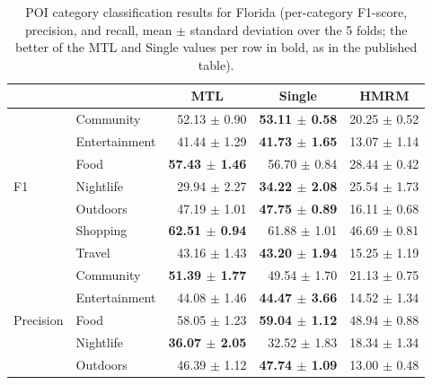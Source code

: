 \begin{table}[htbp]
\caption{POI category classification results for Florida (per-category F1-score, precision, and recall, mean $\pm$ standard deviation over the 5 folds; the better of the MTL and Single values per row in bold, as in the published table).}
\label{tab:cbic:category}
\centering
\begin{tabular}{llrrr}
\toprule
 & & \multicolumn{1}{c}{\textbf{MTL}} & \multicolumn{1}{c}{\textbf{Single}} & \multicolumn{1}{c}{\textbf{HMRM}} \\
\midrule
\multirow{7}{*}{F1}        & Community     & 52.13 $\pm$ 0.90          & \textbf{53.11 $\pm$ 0.58} & 20.25 $\pm$ 0.52 \\
                           & Entertainment & 41.44 $\pm$ 1.29          & \textbf{41.73 $\pm$ 1.65} & 13.07 $\pm$ 1.14 \\
                           & Food          & \textbf{57.43 $\pm$ 1.46} & 56.70 $\pm$ 0.84          & 28.44 $\pm$ 0.42 \\
                           & Nightlife     & 29.94 $\pm$ 2.27          & \textbf{34.22 $\pm$ 2.08} & 25.54 $\pm$ 1.73 \\
                           & Outdoors      & 47.19 $\pm$ 1.01          & \textbf{47.75 $\pm$ 0.89} & 16.11 $\pm$ 0.68 \\
                           & Shopping      & \textbf{62.51 $\pm$ 0.94} & 61.88 $\pm$ 1.01          & 46.69 $\pm$ 0.81 \\
                           & Travel        & 43.16 $\pm$ 1.43          & \textbf{43.20 $\pm$ 1.94} & 15.25 $\pm$ 1.19 \\
\midrule
\multirow{7}{*}{Precision} & Community     & \textbf{51.39 $\pm$ 1.77} & 49.54 $\pm$ 1.70          & 21.13 $\pm$ 0.75 \\
                           & Entertainment & 44.08 $\pm$ 1.46          & \textbf{44.47 $\pm$ 3.66} & 14.52 $\pm$ 1.34 \\
                           & Food          & 58.05 $\pm$ 1.23          & \textbf{59.04 $\pm$ 1.12} & 48.94 $\pm$ 0.88 \\
                           & Nightlife     & \textbf{36.07 $\pm$ 2.05} & 32.52 $\pm$ 1.83          & 18.34 $\pm$ 1.34 \\
                           & Outdoors      & 46.39 $\pm$ 1.12          & \textbf{47.74 $\pm$ 1.09} & 13.00 $\pm$ 0.48 \\

\end{tabular}
\end{table}

